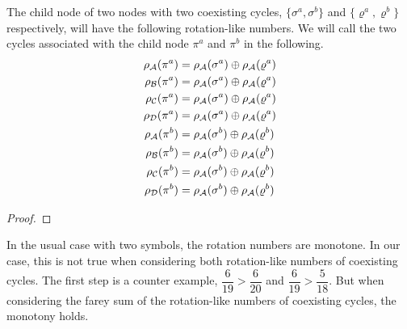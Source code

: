 \begin{theorem}
    The child node of two nodes with two coexisting cycles, $\{\sigma^a, \sigma^b\}$ and $\{\varrho^a, \varrho^b\}$ respectively, will have the following rotation-like numbers.
    We will call the two cycles associated with the child node $\pi^a$ and $\pi^b$ in the following.
    \begin{align*}
        \rho_{\mathcal{A}}(\pi^a) & = \rho_{\mathcal{A}}(\sigma^a) \oplus \rho_{\mathcal{A}}(\varrho^a) \\
        \rho_{\mathcal{B}}(\pi^a) & = \rho_{\mathcal{A}}(\sigma^a) \oplus \rho_{\mathcal{A}}(\varrho^a) \\
        \rho_{\mathcal{C}}(\pi^a) & = \rho_{\mathcal{A}}(\sigma^a) \oplus \rho_{\mathcal{A}}(\varrho^a) \\
        \rho_{\mathcal{D}}(\pi^a) & = \rho_{\mathcal{A}}(\sigma^a) \oplus \rho_{\mathcal{A}}(\varrho^a) \\
        \rho_{\mathcal{A}}(\pi^b) & = \rho_{\mathcal{A}}(\sigma^b) \oplus \rho_{\mathcal{A}}(\varrho^b) \\
        \rho_{\mathcal{B}}(\pi^b) & = \rho_{\mathcal{A}}(\sigma^b) \oplus \rho_{\mathcal{A}}(\varrho^b) \\
        \rho_{\mathcal{C}}(\pi^b) & = \rho_{\mathcal{A}}(\sigma^b) \oplus \rho_{\mathcal{A}}(\varrho^b) \\
        \rho_{\mathcal{D}}(\pi^b) & = \rho_{\mathcal{A}}(\sigma^b) \oplus \rho_{\mathcal{A}}(\varrho^b)
    \end{align*}
\end{theorem}

\begin{proof}
\end{proof}

In the usual case with two symbols, the rotation numbers are monotone.
In our case, this is not true when considering both rotation-like numbers of coexisting cycles.
The first step is a counter example, $\dfrac{6}{19} > \dfrac{6}{20}$ and $\dfrac{6}{19} > \dfrac{5}{18}$.
But when considering the farey sum of the rotation-like numbers of coexisting cycles, the monotony holds.

